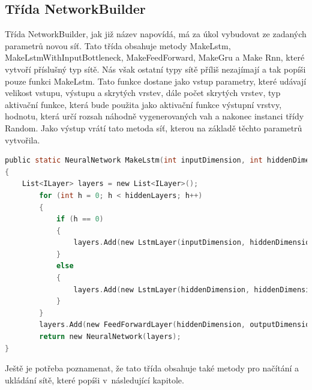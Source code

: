\documentclass[a4paper]{article}
\begin{document}
\subsection{Třída NetworkBuilder}
Třída NetworkBuilder, jak již název napovídá, má za úkol vybudovat ze zadaných parametrů novou síť. Tato třída obsahuje metody MakeLstm, MakeLstmWithInputBottleneck, MakeFeedForward, MakeGru a Make Rnn, které vytvoří příslušný typ sítě. Nás však ostatní typy sítě příliš nezajímají a tak popíši pouze funkci MakeLstm. Tato funkce dostane jako vstup parametry, které udávají velikost vstupu, výstupu a skrytých vrstev, dále počet skrytých vrstev, typ aktivační funkce, která bude použita jako aktivační funkce výstupní vrstvy, hodnotu, která určí rozsah náhodně vygenerovaných vah a nakonec instanci třídy Random. Jako výstup vrátí tato metoda síť, kterou na základě těchto parametrů vytvořila.

\begin{lstlisting}[language=C, title={Ukázka funkce MakeLstm}]
public static NeuralNetwork MakeLstm(int inputDimension, int hiddenDimension, int hiddenLayers, int outputDimension, INonlinearity decoderUnit, double initParamsStdDev, Random rng)
{
	List<ILayer> layers = new List<ILayer>();
        for (int h = 0; h < hiddenLayers; h++)
        {
            if (h == 0)
            {
                layers.Add(new LstmLayer(inputDimension, hiddenDimension, initParamsStdDev, rng));
            }
            else
            {
                layers.Add(new LstmLayer(hiddenDimension, hiddenDimension, initParamsStdDev, rng));
            }
        }
        layers.Add(new FeedForwardLayer(hiddenDimension, outputDimension, decoderUnit, initParamsStdDev, rng));
        return new NeuralNetwork(layers);
}
\end{lstlisting}
Ještě je potřeba poznamenat, že tato třída obsahuje také metody pro načítání a ukládání sítě, které popíši v~následující kapitole.
\end{document}
